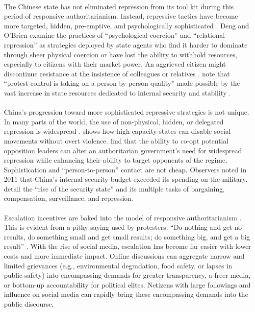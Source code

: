 \documentclass[12pt]{article}
\begin{document}
\begin{CJK*}{UTF8}{gbsn}
\paragraph{} The Chinese state has not eliminated repression from its tool kit during this period of responsive authoritarianism. Instead, repressive tactics have become more targeted, hidden, pre-emptive, and psychologically sophisticated \citep{ong2015thugs,chen2017origins,cai2008local}. Deng and O'Brien examine the practices of ``psychological coercion'' and ``relational repression'' as strategies deployed by state agents who find it harder to dominate through sheer physical coercion or have lost the ability to withhold resources, especially to citizens with their market power. An aggrieved citizen might discontinue resistance at the insistence of colleagues or relatives \citep{o2015repression, deng2013relational}. \cite{o2017preventing} note that ``protest control is taking on a person-by-person quality'' made possible by the vast increase in state resources dedicated to internal security and stability \citep[see also][]{wang2015rise,ong2015thugs}.

\paragraph{} China's progression toward more sophisticated repressive strategies is not unique. In many parts of the world, the use of non-physical, hidden, or delegated repression is widespread \citep{earl2003tanks}. \cite{davenport2007state} shows how high capacity states can disable social movements without overt violence. \cite{frantz2014dictator} find that the ability to co-opt potential opposition leaders can alter an authoritarian government's need for widespread repression while enhancing their ability to target opponents of the regime. Sophistication and ``person-to-person'' contact are not cheap. Observers noted in 2011 that China's internal security budget exceeded its spending on the military. \cite{wang2015rise} detail the ``rise of the security state'' and its multiple tasks of bargaining, compensation, surveillance, and repression.

\paragraph{} Escalation incentives are baked into the model of responsive authoritarianism \citep{tanner2004china,chen2012social,cai2010collect,o2015repression}. This is evident from a pithy saying used by protesters: ``Do nothing and get no results, do something small and get small results; do something big, and get a big result'' \citep{tanner2004china}. With the rise of social media, escalation has become far easier with lower costs and more immediate impact. Online discussions can aggregate narrow and limited grievances (e.g., environmental degradation, food safety, or lapses in public safety) into encompassing demands for greater transparency, a freer media, or bottom-up accountability for political elites. Netizens with large followings and influence on social media can rapidly bring these encompassing demands into the public discourse.


\end{CJK*}
\end{document}
